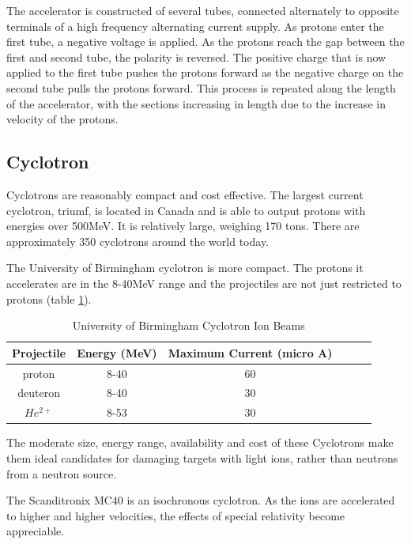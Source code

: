 The accelerator is constructed of several tubes, connected alternately to opposite terminals of a high frequency alternating current supply.  As protons enter the first tube, a negative voltage is applied.  As the protons reach the gap between the first and second tube, the polarity is reversed.  The positive charge that is now applied to the first tube pushes the protons forward as the negative charge on the second tube pulls the protons forward.  This process is repeated along the length of the accelerator, with the sections increasing in length due to the increase in velocity of the protons.




\FloatBarrier
\subsection{Cyclotron}

Cyclotrons are reasonably compact and cost effective.  The largest current cyclotron, \acrlong{triumf}, is located in Canada and is able to output protons with energies over 500MeV.  It is relatively large, weighing 170 tons.  There are approximately 350 cyclotrons\cite{cyclotrons} around the world today.

The University of Birmingham cyclotron is more compact.  The protons it accelerates are in the 8-40MeV range and the projectiles are not just restricted to protons (table \ref{table:mc40projectiles}).


\begin{table}[h]
\begin{center}
\renewcommand{\arraystretch}{1.2}
\begin{tabular}{c c c c c c}
\hline\hline
Projectile & Energy (MeV) & Maximum Current (micro A) \\
\hline\hline 
proton & 8-40 & 60 \\
deuteron & 8-40 & 30 \\
$He^{2+}$ & 8-53 & 30 \\
\hline\hline
\end{tabular}
\end{center}
\caption{University of Birmingham Cyclotron Ion Beams}
\label{table:mc40projectiles}
\end{table}

The moderate size, energy range, availability and cost of these Cyclotrons make them ideal candidates for damaging targets with light ions, rather than neutrons from a neutron source.

The Scanditronix MC40 is an isochronous cyclotron.  As the ions are accelerated to higher and higher velocities, the effects of special relativity become appreciable.

